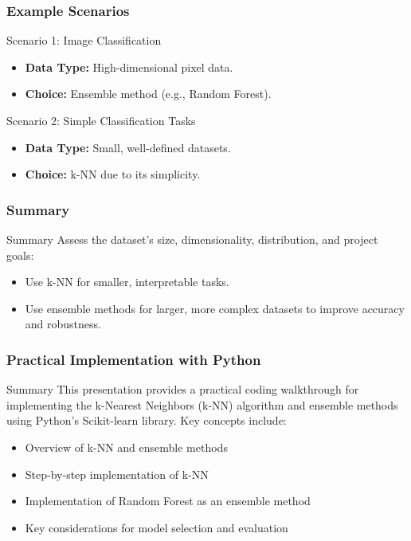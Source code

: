 \documentclass[aspectratio=169]{beamer}
\begin{document}
\begin{frame}[fragile]
    \frametitle{Example Scenarios}
    \begin{block}{Scenario 1: Image Classification}
        \begin{itemize}
            \item \textbf{Data Type:} High-dimensional pixel data.
            \item \textbf{Choice:} Ensemble method (e.g., Random Forest).
        \end{itemize}
    \end{block}
    \begin{block}{Scenario 2: Simple Classification Tasks}
        \begin{itemize}
            \item \textbf{Data Type:} Small, well-defined datasets.
            \item \textbf{Choice:} k-NN due to its simplicity.
        \end{itemize}
    \end{block}
\end{frame}

\begin{frame}[fragile]
    \frametitle{Summary}
    \begin{block}{Summary}
        Assess the dataset’s size, dimensionality, distribution, and project goals:
        \begin{itemize}
            \item Use k-NN for smaller, interpretable tasks.
            \item Use ensemble methods for larger, more complex datasets to improve accuracy and robustness.
        \end{itemize}
    \end{block}
\end{frame}

\begin{frame}
    \frametitle{Practical Implementation with Python}
    \begin{block}{Summary}
        This presentation provides a practical coding walkthrough for implementing the k-Nearest Neighbors (k-NN) algorithm and ensemble methods using Python's Scikit-learn library. Key concepts include:
        \begin{itemize}
            \item Overview of k-NN and ensemble methods
            \item Step-by-step implementation of k-NN
            \item Implementation of Random Forest as an ensemble method
            \item Key considerations for model selection and evaluation
        \end{itemize}
    \end{block}
\end{frame}
\end{document}
